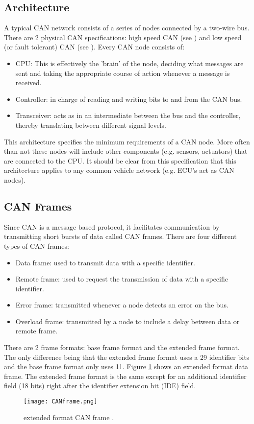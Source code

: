 \subsection{Architecture}
\label{subsec:can:architecture}

A typical CAN network consists of a series of nodes connected by a two-wire bus. There are 2 physical CAN specifications: high speed CAN (see \cite{ISO11898-2}) and low speed (or fault tolerant) CAN (see \cite{ISO11898-3}). Every CAN node consists of:
\begin{itemize}
	\item CPU: This is effectively the 'brain' of the node, deciding what messages are sent and taking the appropriate course of action whenever a message is received.
	\item Controller: in charge of reading and writing bits to and from the CAN bus.
	\item Transceiver: acts as in an intermediate between the bus and the controller, thereby translating between different signal levels.
\end{itemize}

This architecture specifies the minimum requirements of a CAN node. More often than not these nodes will include other components (e.g. sensors, actuators) that are connected to the CPU. It should be clear from this specification that this architecture applies to any common vehicle network (e.g. ECU's act as CAN nodes).

\subsection{CAN Frames}
\label{subsec:can:frames}

Since CAN is a message based protocol, it facilitates communication by transmitting short bursts of data called CAN frames. There are four different types of CAN frames:
\begin{itemize}
	\item Data frame: used to transmit data with a specific identifier.
	\item Remote frame: used to request the transmission of data with a specific identifier.
	\item Error frame: transmitted whenever a node detects an error on the bus.
	\item Overload frame: transmitted by a node to include a delay between data or remote frame.
\end{itemize}

There are 2 frame formats: base frame format and the extended frame format. The only difference being that the extended frame format uses a 29 identifier bits and the base frame format only uses 11. Figure \ref{fig:CANframe} shows an extended format data frame. The extended frame format is the same except for an additional identifier field (18 bits) right after the identifier extension bit (IDE) field. 
\begin{figure}[h]
	\label{fig:CANframe}
	\centering
	\texttt{[image: CANframe.png]}
	\caption{extended format CAN frame \cite{Pan}.}
\end{figure}

